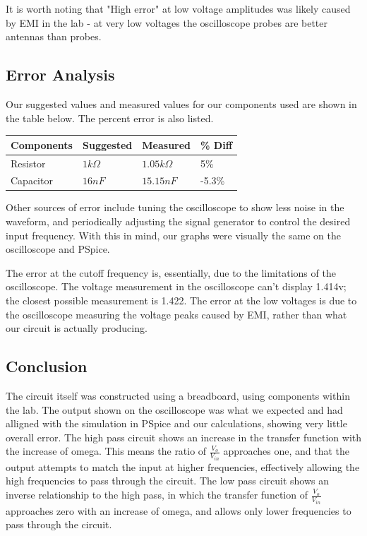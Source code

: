 \documentclass[11pt]{article}
\begin{document}
It is worth noting that "High error" at low voltage amplitudes was likely caused by EMI in the lab - at very low voltages the oscilloscope probes are better antennas than probes.
	
	\subsection*{Error Analysis}
	Our suggested values and measured values for our components used are shown in the table below. The percent error is also listed.
		\begin{table}[H]
		\def\arraystretch{1.2}%
		\centering
		\begin{tabular}{|l|l|l|l|}
			\hline
			Components       	& Suggested 		& Measured      	&\% Diff	\\ \hline
			Resistor  	    	& $1 k\Omega$		& $1.05 k\Omega$   & 5\%	     \\ \hline	
			Capacitor			& $16 n F$			& $15.15 nF$		& -5.3\%		\\ \hline
		\end{tabular}
	\end{table}

	Other sources of error include tuning the oscilloscope to show less noise in the waveform, and periodically adjusting the signal generator to control the desired input frequency. With this in mind, our graphs were visually the same on the oscilloscope and PSpice.
	
	The error at the cutoff frequency is, essentially, due to the limitations of the oscilloscope. The voltage measurement in the oscilloscope can't display 1.414v; the closest possible measurement is 1.422. The error at the low voltages is due to the oscilloscope measuring the voltage peaks caused by EMI, rather than what our circuit is actually producing.
	\subsection*{Conclusion}
	The circuit itself was constructed using a breadboard, using components within the lab. The output shown on the oscilloscope was what we expected and had alligned with the simulation in PSpice and our calculations, showing very little overall error. 
	The high pass circuit shows an increase in the transfer function with the increase of omega. This means the ratio of $\frac{V_{o}}{V_{in}}$ approaches one, and that the output attempts to match the input at higher frequencies, effectively allowing the high frequencies to pass through the circuit. 
	The low pass circuit shows an inverse relationship to the high pass, in which the transfer function of $\frac{V_{o}}{V_{in}}$ approaches zero with an increase of omega, and allows only lower frequencies to pass through the circuit. 
	\newpage
\end{document}
